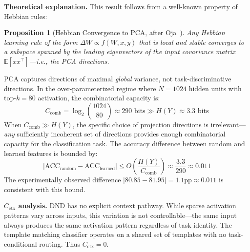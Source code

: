 \documentclass{article}
\newtheorem{proposition}[theorem]{Proposition}
\begin{document}
\textbf{Theoretical explanation.} This result follows from a well-known property of Hebbian rules:

\begin{proposition}[Hebbian Convergence to PCA, after Oja~\citeyear{oja1982simplified}]
\label{prop:oja}
Any Hebbian learning rule of the form $\Delta W \propto f(W, x, y)$ that is local and stable converges to a subspace spanned by the leading eigenvectors of the input covariance matrix $\mathbb{E}[xx^\top]$---i.e., the PCA directions.
\end{proposition}

PCA captures directions of maximal \emph{global} variance, not task-discriminative directions. In the over-parameterized regime where $N = 1024$ hidden units with top-$k = 80$ activation, the combinatorial capacity is:
\begin{equation}
    C_\mathrm{comb} = \log_2 \binom{1024}{80} \approx 290 \text{ bits} \gg H(Y) \approx 3.3 \text{ bits}
\end{equation}
When $C_\mathrm{comb} \gg H(Y)$, the specific choice of projection directions is irrelevant---\emph{any} sufficiently incoherent set of directions provides enough combinatorial capacity for the classification task. The accuracy difference between random and learned features is bounded by:
\begin{equation}
    |\mathrm{ACC}_\mathrm{random} - \mathrm{ACC}_\mathrm{learned}| \leq O\!\left(\frac{H(Y)}{C_\mathrm{comb}}\right) \approx \frac{3.3}{290} \approx 0.011
\end{equation}
The experimentally observed difference $|80.85 - 81.95| = 1.1\text{pp} \approx 0.011$ is consistent with this bound.

\textbf{$C_\mathrm{ctx}$ analysis.} DND has no explicit context pathway. While sparse activation patterns vary across inputs, this variation is not controllable---the same input always produces the same activation pattern regardless of task identity. The template matching classifier operates on a shared set of templates with no task-conditional routing. Thus $C_\mathrm{ctx} = 0$.
\end{document}

